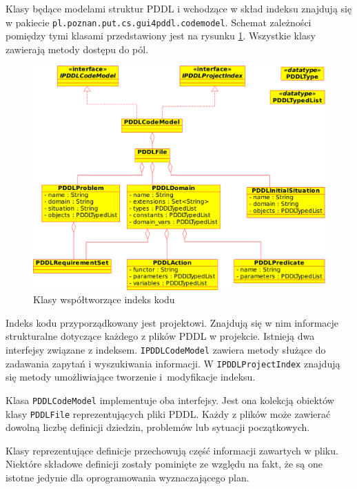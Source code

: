 Klasy będące modelami struktur PDDL i wchodzące w skład indeksu znajdują się w pakiecie
\texttt{pl.poznan.put.cs.gui4pddl.codemodel}. Schemat zależności pomiędzy tymi klasami
przedstawiony jest na rysunku \ref{ana_model}. Wszystkie klasy zawierają metody dostępu
do pól.

\begin{figure}[h]
  \centering
    \includegraphics[width=\textwidth]{img/ana_model.pdf}
    \caption{Klasy współtworzące indeks kodu}
    \label{ana_model}
\end{figure}

Indeks kodu przyporządkowany jest projektowi. Znajdują się w nim informacje strukturalne dotyczące każdego
z plików PDDL w projekcie. Istnieją dwa interfejsy związane z indeksem. \texttt{IPDDLCodeModel}
zawiera metody służące do zadawania zapytań i wyszukiwania informacji. W \texttt{IPDDLProjectIndex}
znajdują się metody umożliwiające tworzenie i~modyfikacje indeksu.

Klasa \texttt{PDDLCodeModel} implementuje oba interfejsy. Jest ona kolekcją obiektów klasy
\texttt{PDDLFile} reprezentujących pliki PDDL. Każdy z plików może zawierać dowolną liczbę
definicji dziedzin, problemów lub sytuacji początkowych.

Klasy reprezentujące definicje przechowują część informacji zawartych w pliku. Niektóre
składowe definicji zostały pominięte ze względu na fakt, że są one istotne jedynie 
dla oprogramowania wyznaczającego plan.

